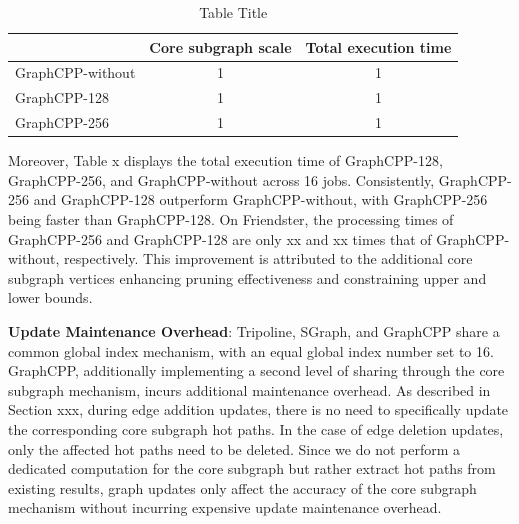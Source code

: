 \documentclass[lettersize,journal]{IEEEtran} %
\begin{document}
\begin{table}[htbp]
    \centering
    \caption{Table Title}
    \label{tab:mytable}
    \begin{tabular}{|l|c|c|}
      \hline
      & Core subgraph scale  & Total execution time \\
      \hline
      GraphCPP-without & 1 & 1 \\
      GraphCPP-128 & 1 & 1 \\
      GraphCPP-256 & 1 & 1 \\
      \hline
    \end{tabular}
  \end{table}

Moreover, Table x displays the total execution time of GraphCPP-128, GraphCPP-256, and GraphCPP-without across 16 jobs. Consistently, GraphCPP-256 and GraphCPP-128 outperform GraphCPP-without, with GraphCPP-256 being faster than GraphCPP-128. On Friendster, the processing times of GraphCPP-256 and GraphCPP-128 are only xx and xx times that of GraphCPP-without, respectively. This improvement is attributed to the additional core subgraph vertices enhancing pruning effectiveness and constraining upper and lower bounds.

{\bf{Update Maintenance Overhead}}: Tripoline, SGraph, and GraphCPP share a common global index mechanism, with an equal global index number set to 16. GraphCPP, additionally implementing a second level of sharing through the core subgraph mechanism, incurs additional maintenance overhead. As described in Section xxx, during edge addition updates, there is no need to specifically update the corresponding core subgraph hot paths. In the case of edge deletion updates, only the affected hot paths need to be deleted. Since we do not perform a dedicated computation for the core subgraph but rather extract hot paths from existing results, graph updates only affect the accuracy of the core subgraph mechanism without incurring expensive update maintenance overhead.
\end{document}
